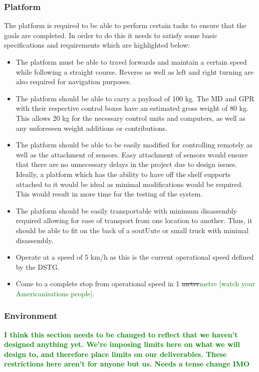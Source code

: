 \documentclass[main.tex]{subfiles}
\begin{document}
\subsubsection{Platform}
The platform is required to be able to perform certain tasks to ensure that the goals are completed. In order to do this it needs to satisfy some basic specifications and requirements which are highlighted below: 
\begin{itemize}
\item The platform must be able to travel forwards and maintain a certain speed while following a straight course. Reverse as well as left and right turning are also required for navigation purposes.
 \item The platform should be able to carry a payload of 100 kg. The MD and GPR with their respective control boxes have an estimated gross weight of 80 kg. This allows 20 kg for the necessary control units and computers, as well as any unforeseen weight additions or contributions. 
\item The platform should be able to be easily modified for controlling remotely as well as the attachment of sensors. Easy attachment of sensors would ensure that there are no unnecessary delays in the project due to design issues. Ideally, a platform which has the ability to have off the shelf supports attached to it would be ideal as minimal modifications would be required. This would result in more time for the testing of the system. 
\item The platform should be easily transportable with minimum disassembly required allowing for ease of transport from one location to another. Thus, it should be able to fit on the back of a sout{U}ute or small truck with minimal disassembly. 
\item Operate at a speed of 5 km/h as this is the current operational speed defined by the DSTG.
\item Come to a complete stop from operational speed in 1 \sout{meter}\textcolor{green}{metre [watch your Americanisations people]}.
\end{itemize}
\subsubsection{Environment}
\textbf{\textcolor{green}{I think this section needs to be changed to reflect that we haven't designed anything yet. We're imposing limits here on what we will design to, and therefore place limits on our deliverables. These restrictions here aren't for anyone but us. Needs a tense change IMO}}
\end{document}
